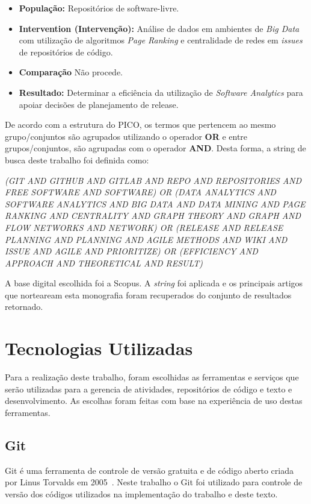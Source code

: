 \begin{itemize}
    \item \textbf{População:} Repositórios de software-livre.
    \item \textbf{Intervention (Intervenção):} Análise de dados em ambientes de \textit{Big Data} com utilização de algoritmos \textit{Page Ranking} e centralidade de redes em \textit{issues} de repositórios de código.
    \item \textbf{Comparação} Não procede.
    \item \textbf{Resultado:} Determinar a eficiência da utilização de \textit{Software Analytics} para apoiar decisões de planejamento de release.
\end{itemize}


De acordo com a estrutura do PICO, os termos que pertencem ao mesmo grupo/conjuntos são agrupados utilizando o operador \textbf{OR} e entre grupos/conjuntos, são agrupadas com o operador \textbf{AND}. Desta forma, a string de busca deste trabalho foi definida como:

\begin{center}
    \textit{(GIT AND GITHUB AND GITLAB AND REPO AND REPOSITORIES AND FREE
    SOFTWARE AND SOFTWARE) OR (DATA ANALYTICS AND SOFTWARE ANALYTICS AND BIG DATA
    AND DATA MINING AND PAGE RANKING AND CENTRALITY AND GRAPH THEORY AND GRAPH AND
    FLOW NETWORKS AND NETWORK) OR (RELEASE AND RELEASE PLANNING AND PLANNING AND
    AGILE METHODS AND WIKI AND ISSUE AND AGILE AND PRIORITIZE) OR (EFFICIENCY AND 
    APPROACH AND THEORETICAL AND RESULT)}
\end{center}

A base digital escolhida foi a Scopus. A \textit{string} foi aplicada e os principais artigos que norteaream esta monografia foram recuperados do conjunto de resultados retornado.

\section{Tecnologias Utilizadas}
\label{met:tec}
Para a realização deste trabalho, foram escolhidas as ferramentas e serviços
que serão utilizadas para a gerencia de atividades, repositórios de código e
texto e desenvolvimento. As escolhas foram feitas com base na experiência de uso
destas ferramentas.

\subsection{Git}
\label{met:tec:git}
Git é uma ferramenta de controle de versão gratuita e de código aberto criada
por Linus Torvalds em 2005~\cite{chacon}. Neste trabalho o Git foi utilizado 
para controle de versão dos códigos utilizados na implementação do trabalho
e deste texto.

